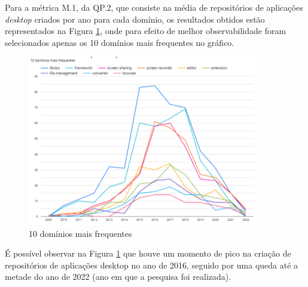 \documentclass[12pt]{article}
\begin{document}
Para a métrica M.1, da QP.2, que consiste na média de repositórios de aplicações \emph{desktop} criados por ano para cada domínio, os resultados obtidos estão representados na Figura \ref{fig:10 domínios mais frequentes}, onde para efeito de melhor observabilidade foram selecionados apenas os 10 domínios mais frequentes no gráfico.
\begin{figure}[H]
    \centering
    \includegraphics[width=0.9\textwidth]{images/10 dom mais fre.png}
    \caption{10 domínios mais frequentes}
    \label{fig:10 domínios mais frequentes}
\end{figure}
É possível observar na Figura \ref{fig:10 domínios mais frequentes} que houve um momento de pico na criação de repositórios de aplicações desktop no ano de 2016, seguido por uma queda até a metade do ano de 2022 (ano em que a pesquisa foi realizada). 
\end{document}
